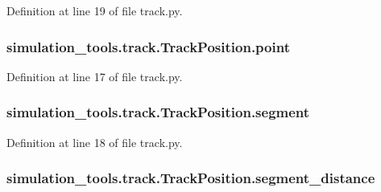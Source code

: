 Definition at line 19 of file track.\+py.

\subsubsection[{\texorpdfstring{point}{point}}]{\setlength{\rightskip}{0pt plus 5cm}simulation\+\_\+tools.\+track.\+Track\+Position.\+point}\hypertarget{classsimulation__tools_1_1track_1_1_track_position_a5c5ad2aecf6e00e6611e8ad70b38de7b}{}\label{classsimulation__tools_1_1track_1_1_track_position_a5c5ad2aecf6e00e6611e8ad70b38de7b}


Definition at line 17 of file track.\+py.

\subsubsection[{\texorpdfstring{segment}{segment}}]{\setlength{\rightskip}{0pt plus 5cm}simulation\+\_\+tools.\+track.\+Track\+Position.\+segment}\hypertarget{classsimulation__tools_1_1track_1_1_track_position_ab5feb6f2789576c88fe7310f28e4c4db}{}\label{classsimulation__tools_1_1track_1_1_track_position_ab5feb6f2789576c88fe7310f28e4c4db}


Definition at line 18 of file track.\+py.

\subsubsection[{\texorpdfstring{segment\+\_\+distance}{segment_distance}}]{\setlength{\rightskip}{0pt plus 5cm}simulation\+\_\+tools.\+track.\+Track\+Position.\+segment\+\_\+distance}\hypertarget{classsimulation__tools_1_1track_1_1_track_position_a89c184a72d3b1636bf9531de144374e4}{}\label{classsimulation__tools_1_1track_1_1_track_position_a89c184a72d3b1636bf9531de144374e4}


